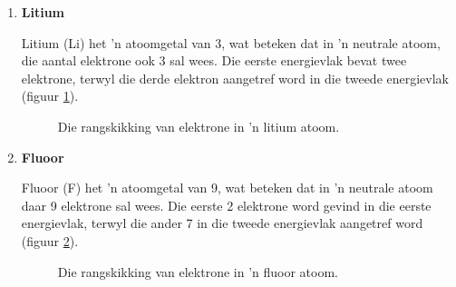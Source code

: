 \begin{enumerate}[noitemsep, label=\textbf{\arabic*}. ] 

\item{\textbf{Litium} \\
\begin{minipage}{.4\textwidth}
Litium (Li) het 'n atoomgetal van 3, wat beteken dat in 'n neutrale atoom, die aantal elektrone ook 3 sal wees. Die eerste energievlak bevat twee elektrone, terwyl die derde elektron aangetref word in die tweede energievlak (figuur \ref{fig:atom:lithium}).
\end{minipage}
\begin{minipage}{.6\textwidth}
\begin{figure}[H]
\begin{center}
\caption{Die rangskikking van elektrone in 'n litium atoom.}
\label{fig:atom:lithium}
\end{center}
\end{figure}
\end{minipage}
}

\item{\textbf{Fluoor} \\
\begin{minipage}{.4\textwidth}
Fluoor (F) het 'n atoomgetal van 9, wat beteken dat in 'n neutrale atoom daar 9 elektrone sal wees. Die eerste 2 elektrone word gevind in die eerste energievlak, terwyl die ander 7 in die tweede energievlak aangetref word (figuur \ref{fig:atom:fluorine}).
\end{minipage}
\begin{minipage}{.6\textwidth}
\begin{figure}[H]
\begin{center}
\caption{Die rangskikking van elektrone in 'n fluoor atoom.}
\label{fig:atom:fluorine}
\end{center}
\end{figure}
\end{minipage}
}


\end{enumerate}
